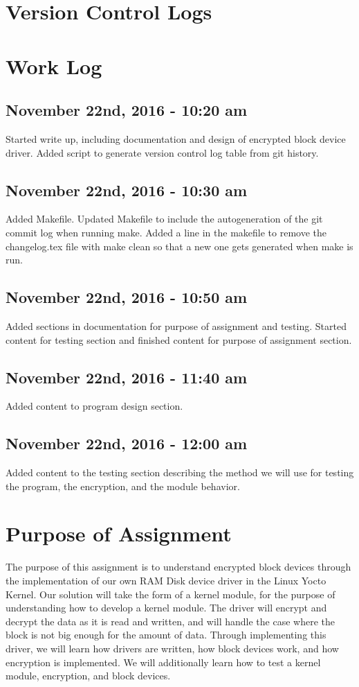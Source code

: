 \documentclass[letterpaper,10pt]{article}
\begin{document}
\section{Version Control Logs}


\section{Work Log}
\subsection{November 22nd, 2016 - 10:20 am}
Started write up, including documentation and design of encrypted block device driver. 
Added script to generate version control log table from git history.

\subsection{November 22nd, 2016 - 10:30 am}
Added Makefile. Updated Makefile to include the autogeneration of the git commit log when running make. 
Added a line in the makefile to remove the changelog.tex file with make clean so that a new one gets 
generated when make is run.

\subsection{November 22nd, 2016 - 10:50 am}
Added sections in documentation for purpose of assignment and testing. Started content for testing 
section and finished content for purpose of assignment section.

\subsection{November 22nd, 2016 - 11:40 am}
Added content to program design section.

\subsection{November 22nd, 2016 - 12:00 am}
Added content to the testing section describing the method we will use for testing the program, the 
encryption, and the module behavior.

\section{Purpose of Assignment}
The purpose of this assignment is to understand encrypted block devices through the implementation of 
our own RAM Disk device driver in the Linux Yocto Kernel. 
Our solution will take the form of a kernel module, for the purpose of understanding how to develop a 
kernel module. 
The driver will encrypt and decrypt the data as it is read and written, and will handle the case where 
the block is not big enough for the amount of data. 
Through implementing this driver, we will learn how drivers are written, how block devices work, and 
how encryption is implemented. 
We will additionally learn how to test a kernel module, encryption, and block devices.
\end{document}
